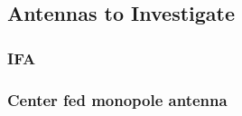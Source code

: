 \subsection{Antennas to Investigate}


\subsubsection{IFA}
\subsubsection{Center fed monopole antenna}